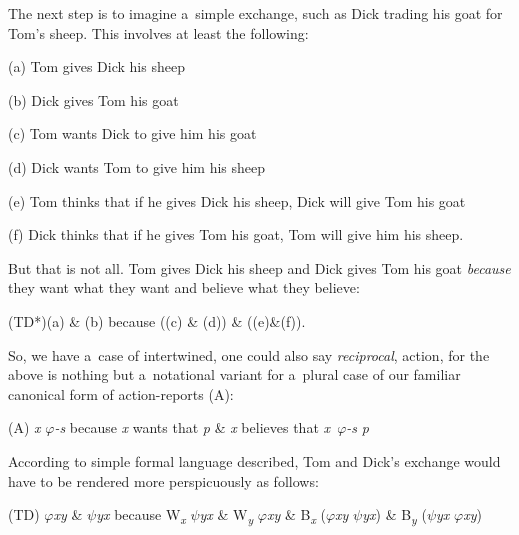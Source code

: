 The next step is to imagine a~simple exchange, such as Dick trading his goat for Tom's sheep. This involves at least the following:



(a) Tom gives Dick his sheep



(b) Dick gives Tom his goat



(c) Tom wants Dick to give him his goat



(d) Dick wants Tom to give him his sheep



(e) Tom thinks that if he gives Dick his sheep, Dick will give Tom his goat



(f) Dick thinks that if he gives Tom his goat, Tom will give him his sheep.



But that is not all. Tom gives Dick his sheep and Dick gives Tom his goat \textit{because} they want what they want and believe what they believe:



(TD*)(a) \& (b) because ((c) \& (d)) \& ((e)\&(f)).



So, we have a~case of intertwined, one could also say \textit{reciprocal}, action, for the above is nothing but a~notational variant for a~plural case of our familiar canonical form of action-reports (A):



(A) \textit{x} \textit{$\varphi $-s} because \textit{x} wants that \textit{p} \& \textit{x} believes that \textit{x~$\varphi $-s}  \textit{p}



According to simple formal language described, Tom and Dick's exchange would have to be rendered more perspicuously as follows:



(TD) \textit{$\varphi $xy} \& \textit{$\psi $yx} because W\textit{\textsubscript{x}} \textit{$\psi $yx} \& W\textit{\textsubscript{y}} \textit{$\varphi $xy} \& B\textit{\textsubscript{x}} (\textit{$\varphi $xy}  \textit{$\psi $yx}) \& B\textit{\textsubscript{y}} (\textit{$\psi $yx}  \textit{$\varphi $xy})



